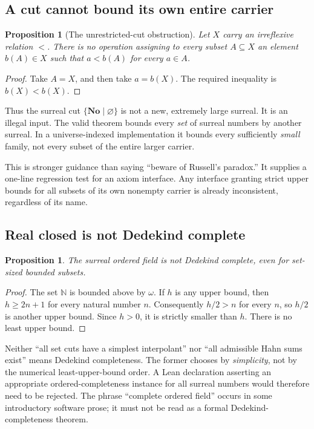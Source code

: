 \documentclass[11pt,letterpaper]{article}
\newtheorem{proposition}[theorem]{Proposition}
\theoremstyle{definition}
\theoremstyle{remark}
\newcommand{\No}{\mathbf{No}}
\newcommand{\N}{\mathbb N}
\numberwithin{equation}{section}
\begin{document}
\subsection{A cut cannot bound its own entire carrier}
\begin{proposition}[The unrestricted-cut obstruction]\label{prop:cut-obstruction}
Let \(X\) carry an irreflexive relation \(<\). There is no operation assigning to every subset \(A\subseteq X\) an element \(b(A)\in X\) such that \(a<b(A)\) for every \(a\in A\).
\end{proposition}
\begin{proof}
Take \(A=X\), and then take \(a=b(X)\). The required inequality is \(b(X)<b(X)\).
\end{proof}

Thus the surreal cut \(\{\No\mid\varnothing\}\) is not a new, extremely large surreal. It is an illegal input. The valid theorem bounds every \emph{set} of surreal numbers by another surreal. In a universe-indexed implementation it bounds every sufficiently \emph{small} family, not every subset of the entire larger carrier.

This is stronger guidance than saying ``beware of Russell's paradox.'' It supplies a one-line regression test for an axiom interface. Any interface granting strict upper bounds for all subsets of its own nonempty carrier is already inconsistent, regardless of its name.

\subsection{Real closed is not Dedekind complete}
\begin{proposition}\label{prop:incomplete}
The surreal ordered field is not Dedekind complete, even for set-sized bounded subsets.
\end{proposition}
\begin{proof}
The set \(\N\) is bounded above by \(\omega\). If \(h\) is any upper bound, then \(h\ge 2n+1\) for every natural number \(n\). Consequently \(h/2>n\) for every \(n\), so \(h/2\) is another upper bound. Since \(h>0\), it is strictly smaller than \(h\). There is no least upper bound.
\end{proof}

Neither ``all set cuts have a simplest interpolant'' nor ``all admissible Hahn sums exist'' means Dedekind completeness. The former chooses by \emph{simplicity}, not by the numerical least-upper-bound order. A Lean declaration asserting an appropriate ordered-completeness instance for all surreal numbers would therefore need to be rejected. The phrase ``complete ordered field'' occurs in some introductory software prose; it must not be read as a formal Dedekind-completeness theorem.
\end{document}
